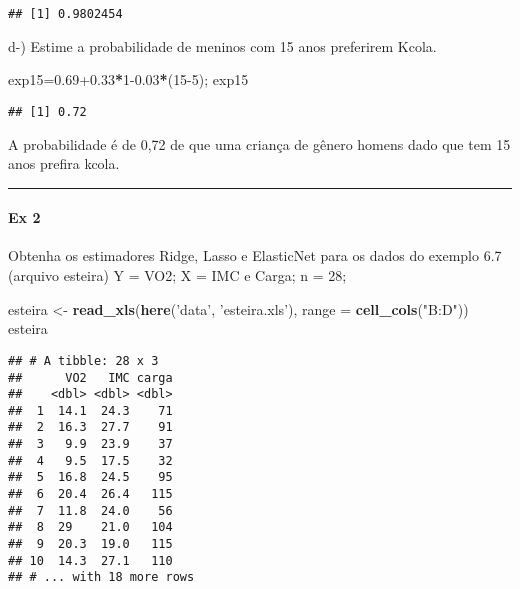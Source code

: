 \documentclass[]{article}
\newenvironment{Shaded}{\begin{snugshade}}{\end{snugshade}}
\newcommand{\DataTypeTok}[1]{\textcolor[rgb]{0.13,0.29,0.53}{#1}}
\newcommand{\DecValTok}[1]{\textcolor[rgb]{0.00,0.00,0.81}{#1}}
\newcommand{\FloatTok}[1]{\textcolor[rgb]{0.00,0.00,0.81}{#1}}
\newcommand{\KeywordTok}[1]{\textcolor[rgb]{0.13,0.29,0.53}{\textbf{#1}}}
\newcommand{\NormalTok}[1]{#1}
\newcommand{\OperatorTok}[1]{\textcolor[rgb]{0.81,0.36,0.00}{\textbf{#1}}}
\newcommand{\StringTok}[1]{\textcolor[rgb]{0.31,0.60,0.02}{#1}}
\let\oldparagraph\paragraph
\renewcommand{\paragraph}[1]{\oldparagraph{#1}\mbox{}}
\begin{document}
\begin{verbatim}
## [1] 0.9802454
\end{verbatim}

d-) Estime a probabilidade de meninos com 15 anos preferirem Kcola.

\begin{Shaded}
\begin{Highlighting}[]
\NormalTok{exp15=}\FloatTok{0.69+0.33}\OperatorTok{*}\DecValTok{1}\FloatTok{-0.03}\OperatorTok{*}\NormalTok{(}\DecValTok{15-5}\NormalTok{); exp15}
\end{Highlighting}
\end{Shaded}

\begin{verbatim}
## [1] 0.72
\end{verbatim}

A probabilidade é de 0,72 de que uma criança de gênero homens dado que
tem 15 anos prefira kcola.

\begin{center}\rule{0.5\linewidth}{0.5pt}\end{center}

\hypertarget{ex-2}{%
\paragraph{Ex 2}\label{ex-2}}

Obtenha os estimadores Ridge, Lasso e ElasticNet para os dados do
exemplo 6.7 (arquivo esteira) Y = VO2; X = IMC e Carga; n = 28;

\begin{Shaded}
\begin{Highlighting}[]
\NormalTok{esteira <-}\StringTok{ }\KeywordTok{read_xls}\NormalTok{(}\KeywordTok{here}\NormalTok{(}\StringTok{'data'}\NormalTok{, }\StringTok{'esteira.xls'}\NormalTok{), }\DataTypeTok{range =} \KeywordTok{cell_cols}\NormalTok{(}\StringTok{"B:D"}\NormalTok{))}
\NormalTok{esteira}
\end{Highlighting}
\end{Shaded}

\begin{verbatim}
## # A tibble: 28 x 3
##      VO2   IMC carga
##    <dbl> <dbl> <dbl>
##  1  14.1  24.3    71
##  2  16.3  27.7    91
##  3   9.9  23.9    37
##  4   9.5  17.5    32
##  5  16.8  24.5    95
##  6  20.4  26.4   115
##  7  11.8  24.0    56
##  8  29    21.0   104
##  9  20.3  19.0   115
## 10  14.3  27.1   110
## # ... with 18 more rows
\end{verbatim}
\end{document}
